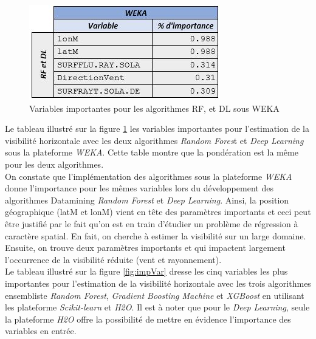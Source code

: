 \begin{figure}[!h]
    \parbox{9cm}{
    \centering
    \includegraphics{img/ImpVweka.JPG}
    }
    \parbox{5cm}{
    \caption{ Variables importantes pour les algorithmes RF, et DL sous WEKA}
    \label{fig:wekaImp}
}
\end{figure}

 Le tableau illustré sur la figure \ref{fig:wekaImp} les variables importantes pour l’estimation de la visibilité horizontale avec les deux algorithmes \textit{Random Fores}t et \textit{Deep Learning} sous la plateforme \textit{WEKA}. Cette table montre que la pondération est la même pour les deux algorithmes.\\
 
  On constate que l'implémentation des algorithmes sous la plateforme \textit{WEKA} donne l'importance pour les mêmes variables lors du développement des algorithmes Datamining \textit{Random Forest} et \textit{Deep Learning}. Ainsi, la position géographique (latM et lonM) vient en tête des paramètres importants et ceci peut être justifié par le fait qu'on est en train d'étudier un problème de régression à caractère spatial. En fait, on cherche à estimer la visibilité sur un large domaine. Ensuite, on trouve deux paramètres importants et qui impactent largement l'occurrence de la visibilité réduite (vent et rayonnement).\\
 
Le tableau illustré sur la figure \ref{fig:impVar} dresse les cinq variables les plus importantes pour l’estimation de la visibilité horizontale avec les trois algorithmes ensembliste \textit{Random Forest}, \textit{Gradient Boosting Machine} et \textit{XGBoost} en utilisant les plateforme \textit{Scikit-learn} et \textit{H2O}. Il est à noter que pour le \textit{Deep Learning}, seule la plateforme \textit{H2O} offre la possibilité de mettre en évidence l'importance des variables en entrée.

